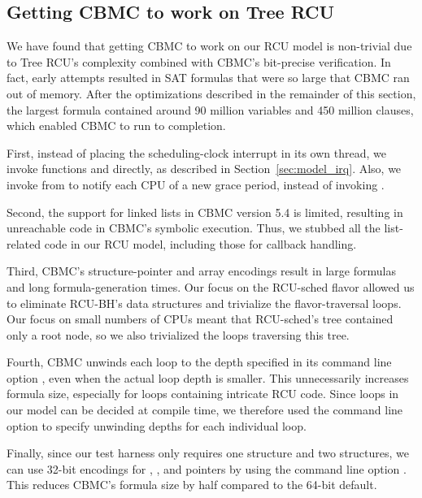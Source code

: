 \subsection{Getting CBMC to work on Tree RCU} \label{sec:cbmc_on_rcu}

We have found that getting CBMC to work on our RCU model is non-trivial due
to Tree RCU's complexity combined with CBMC's bit-precise verification.  In
fact, early attempts resulted in SAT formulas that were so large that CBMC
ran out of memory.  After the optimizations described in the remainder of
this section, the largest formula contained around 90 million variables
and 450 million clauses, which enabled CBMC to run to completion.
%

First, instead of placing the scheduling-clock interrupt in its own thread,
we invoke functions  and
 directly, as described in
Section~\ref{sec:model_irq}.  Also, we invoke
 from  to notify each CPU of a new
grace period, instead of invoking .
%

Second, the support for linked lists in CBMC version 5.4 is limited,
resulting in unreachable code in CBMC's symbolic execution. Thus, we
stubbed all the list-related code in our RCU model, including those for
callback handling.

Third, CBMC's structure-pointer and array encodings result in large formulas
and long formula-generation times.  Our focus on the RCU-sched flavor
allowed us to eliminate RCU-BH's data structures and trivialize the
 flavor-traversal loops.  Our focus on small
numbers of CPUs meant that RCU-sched's  tree contained only a
root node, so we also trivialized the 
loops traversing this tree.

Fourth, CBMC unwinds each loop to the depth specified in its command line
option , even when the actual loop depth is smaller.  This
unnecessarily increases formula size, especially for loops containing
intricate RCU code. Since loops in our model can be decided at compile time, 
we therefore used the command line option  to specify 
unwinding depths for each individual loop.

Finally, since our test harness only requires one  structure
and two  structures, we can use 32-bit encodings for ,
, and pointers by using the command line option .  This
reduces CBMC's formula size by half compared to the 64-bit default.

